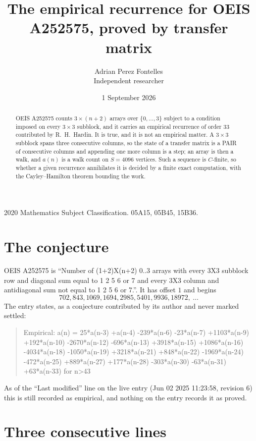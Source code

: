 \documentclass[11pt,a4paper]{article}
\title{The empirical recurrence for OEIS A252575, proved by transfer matrix}
\author{Adrian Perez Fontelles\\ \small Independent researcher}
\date{1 September 2026}
\theoremstyle{plain}
\theoremstyle{definition}
\begin{document}
\maketitle

\begin{abstract}
OEIS A252575 counts $3\times(n+2)$ arrays over $\{0,\dots,3\}$ subject to a condition imposed on
every $3\times3$ subblock, and it carries an empirical recurrence of order $33$
contributed by R.~H.~Hardin. It is true, and it is not an empirical matter. A $3\times3$
subblock spans three consecutive columns, so the state of a transfer matrix is a PAIR of
consecutive columns and appending one more column is a step; an array is then a walk, and
$a(n)$ is a walk count on $S=4096$ vertices. Such a sequence is $C$-finite, so whether a given
recurrence annihilates it is decided by a finite exact computation, with the Cayley--Hamilton
theorem bounding the work.
\end{abstract}

\noindent\small 2020 Mathematics Subject Classification. 05A15, 05B45, 15B36.\normalsize

\section{The conjecture}

OEIS A252575 is ``Number of (1+2)X(n+2) 0..3 arrays with every 3X3 subblock row and diagonal sum equal to 1 2 5 6 or 7 and every 3X3 column and antidiagonal sum not equal to 1 2 5 6 or 7.''. It has offset $1$ and begins
\[
702, 843, 1069, 1694, 2985, 5401, 9936, 18972,\ \dots
\]
The entry states, as a conjecture contributed by its author and never marked settled:
\begin{quote}
Empirical: a(n) = 25*a(n-3) +a(n-4) -239*a(n-6) -23*a(n-7) +1103*a(n-9) +192*a(n-10) -2670*a(n-12) -696*a(n-13) +3918*a(n-15) +1086*a(n-16) -4034*a(n-18) -1050*a(n-19) +3218*a(n-21) +848*a(n-22) -1969*a(n-24) -472*a(n-25) +889*a(n-27) +177*a(n-28) -303*a(n-30) -63*a(n-31) +63*a(n-33) for n>43
\end{quote}
As of the ``Last modified'' line on the live entry (Jun 02 2025 11:23:58, revision 6) this is still
recorded as empirical, and nothing on the entry records it as proved.

\section{Three consecutive lines}
\end{document}
